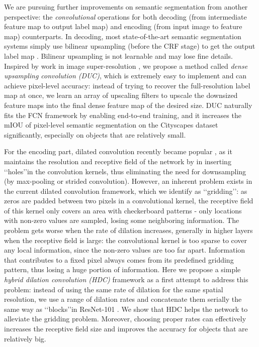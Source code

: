 \documentclass[10pt,twocolumn,letterpaper]{article}
\begin{document}
We are pursuing further improvements on semantic segmentation from another perspective: the \textit{convolutional} operations for both decoding (from intermediate feature map to output label map) and encoding (from input image to feature map) counterparts. In decoding, most state-of-the-art semantic segmentation systems simply use bilinear upsampling (before the CRF stage) to get the output label map \cite{lin2015efficient,liu2015semantic,chen2016deeplab}. Bilinear upsampling is not learnable and may lose fine details. Inspired by work in image super-resolution \cite{shi2016real}, we propose a method called  \textit{dense upsampling convolution (DUC)}, which is extremely easy to implement and can achieve pixel-level accuracy: instead of trying to recover the full-resolution label map at once, we learn an array of upscaling filters to upscale the downsized feature maps into the final dense feature map of the desired size. DUC naturally fits the FCN framework by enabling end-to-end training, and it increases the mIOU of pixel-level semantic segmentation on the Cityscapes dataset \cite{Cordts2016Cityscapes} significantly, especially on objects that are relatively small.

For the encoding part, dilated convolution recently became popular \cite{chen2016deeplab,yu2015multi,wu2016high,zhou2016semantic}, as it maintains the resolution and receptive field of the network by in inserting \lq\lq holes\rq\rq in the convolution kernels, thus eliminating the need for downsampling (by max-pooling or strided convolution). However, an inherent problem exists in the current dilated convolution framework, which we identify as \lq\lq gridding\rq\rq: as zeros are padded between two pixels in a convolutional kernel, the receptive field of this kernel only covers an area with checkerboard patterns - only locations with non-zero values are sampled, losing some neighboring information. The problem gets worse when the rate of dilation increases, generally in higher layers when the receptive field is large: the convolutional kernel is too sparse to cover any local information, since the non-zero values are too far apart. Information that contributes to a fixed pixel always comes from its predefined gridding pattern, thus losing a huge portion of information. Here we propose a simple \textit{hybrid dilation convolution (HDC)} framework as a first attempt to address this problem: instead of using the same rate of dilation for the same spatial resolution, we use a range of dilation rates and concatenate them serially the same way as \lq\lq blocks\rq\rq in ResNet-101 \cite{he2015deep}. We show that HDC helps the network to alleviate the gridding problem. Moreover, choosing proper rates can effectively increases the receptive field size and improves the accuracy for objects that are relatively big.
\end{document}
